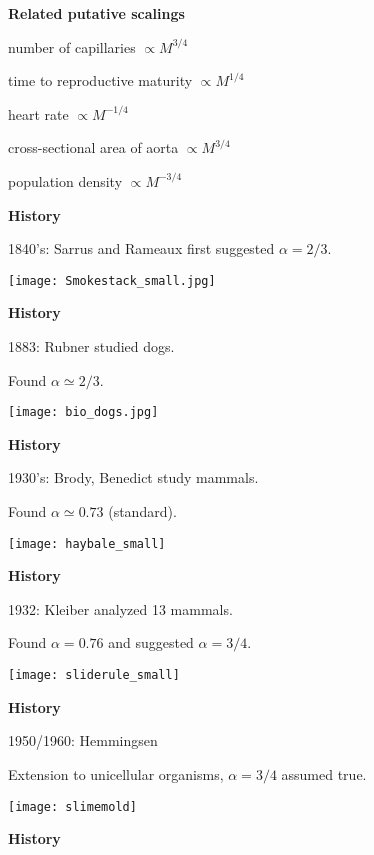 {  \textbf{Related putative scalings}

number of capillaries $\propto M^{3/4}$

time to reproductive maturity $\propto M^{1/4}$

heart rate $\propto M^{-1/4}$

cross-sectional area of aorta $\propto M^{3/4}$

population density $\propto M^{-3/4}$


  \textbf{History}

1840's: Sarrus and Rameaux first suggested $\alpha=2/3$.

\begin{center}
  \texttt{[image: Smokestack\_small.jpg]}
\end{center}


  \textbf{History}

1883: Rubner studied dogs.

Found $\alpha \simeq 2/3$.

\begin{center}
  \texttt{[image: bio\_dogs.jpg]}
\end{center}


  \textbf{History}

1930's: Brody, Benedict study mammals.

Found $\alpha \simeq 0.73 $ (standard).

\begin{center}
  \texttt{[image: haybale\_small]}
\end{center}


  \textbf{History}

1932: Kleiber analyzed 13 mammals.

Found $\alpha=0.76$ and suggested $\alpha=3/4$.

\begin{center}
  \texttt{[image: sliderule\_small]}
\end{center}


  \textbf{History}

  1950/1960: Hemmingsen

  Extension to unicellular organisms, $\alpha=3/4$ assumed true.

\begin{center}
  \texttt{[image: slimemold]}
\end{center}


  \textbf{History}

}
